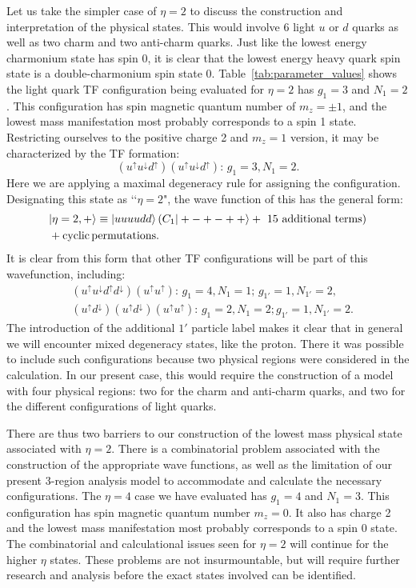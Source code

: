 \documentclass[preprint,12pt]{elsarticle}
\begin{document}
    Let us take the simpler case of $\eta=2$ to discuss the construction and interpretation of the physical states. This would involve 6 light $u$ or $d$ quarks as well as two charm and two anti-charm quarks. Just like the lowest energy charmonium state has spin 0, it is clear that the lowest energy heavy quark spin state is a double-charmonium spin state 0. Table~\ref{tab:parameter_values} shows the light quark TF configuration being evaluated for $\eta=2$ has $g_1=3$ and $N_1=2$. This configuration has spin magnetic quantum number of $m_z=\pm 1$, and the lowest mass manifestation most probably corresponds to a spin 1 state. Restricting ourselves to the positive charge 2 and $m_z=1$ version, it may be characterized by the TF formation:
    \begin{equation*}
    (u^{\uparrow}u^{\downarrow}d^{\uparrow})(u^{\uparrow}u^{\downarrow}d^{\uparrow}): \, g_1=3, N_1=2.
    \end{equation*}
    Here we are applying a maximal degeneracy rule for assigning the configuration. Designating this state as \lq\lq $\eta=2$", the wave function of this has the general form:
    \begin{eqnarray}
        &|\eta=2,+\rangle\equiv |uuuudd\rangle \left(C_1|+-+-++\rangle+\text{ 15 additional terms}\right) \nonumber\\&+{\rm cyclic\, permutations}.\label{proton}
    \end{eqnarray}
    It is clear from this form that other TF configurations will be part of this wavefunction, including:
    \begin{eqnarray*}
        & (u^{\uparrow}u^{\downarrow}d^{\uparrow}d^{\downarrow})(u^{\uparrow}u^{\uparrow}): \, g_1=4, N_1=1;\, g_{1'}=1, N_{1'}=2,\\ 
        & (u^{\uparrow}d^{\downarrow})(u^{\uparrow}d^{\downarrow})(u^{\uparrow}u^{\uparrow}): \, g_1=2, N_1=2; g_{1'}=1,N_{1'}=2. 
    \end{eqnarray*}
    The introduction of the additional $1'$ particle label makes it clear that in general we will encounter mixed degeneracy states, like the proton. There it was possible to include such configurations because two physical regions were considered in the calculation. In our present case, this would require the construction of a model with four physical regions: two for the charm and anti-charm quarks, and two for the different configurations of light quarks.
    
    There are thus two barriers to our construction of the lowest mass physical state associated with $\eta=2$. There is a combinatorial problem associated with the construction of the appropriate wave functions, as well as the limitation of our present 3-region analysis model to accommodate and calculate the necessary configurations. The $\eta=4$ case we have evaluated has $g_1=4$ and $N_1=3$. This configuration has spin magnetic quantum number $m_z=0$. It also has charge 2 and the lowest mass manifestation most probably corresponds to a spin 0 state. The combinatorial and calculational issues seen for $\eta=2$ will continue for the higher $\eta$ states. These problems are not insurmountable, but will require further research and analysis before the exact states involved can be identified.
    
\end{document}
